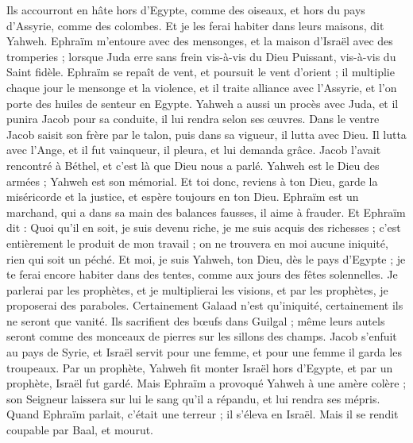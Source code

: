 \begin{multicols}{2}
Ils accourront en hâte hors d'Egypte, comme des oiseaux, et hors du pays d'Assyrie, comme des colombes. Et je les ferai habiter dans leurs maisons, dit Yahweh.
\VerseOne{}Ephraïm m'entoure avec des mensonges, et la maison d'Israël avec des tromperies ; lorsque Juda erre sans frein vis-à-vis du Dieu Puissant, vis-à-vis du Saint fidèle.
Ephraïm se repaît de vent, et poursuit le vent d'orient ; il multiplie chaque jour le mensonge et la violence, et il traite alliance avec l'Assyrie, et l'on porte des huiles de senteur en Egypte.
Yahweh a aussi un procès avec Juda, et il punira Jacob pour sa conduite, il lui rendra selon ses œuvres.
Dans le ventre Jacob saisit son frère par le talon, puis dans sa vigueur, il lutta avec Dieu.
Il lutta avec l'Ange, et il fut vainqueur, il pleura, et lui demanda grâce. Jacob l'avait rencontré à Béthel, et c'est là que Dieu nous a parlé.
Yahweh est le Dieu des armées ; Yahweh est son mémorial.
Et toi donc, reviens à ton Dieu, garde la miséricorde et la justice, et espère toujours en ton Dieu.
Ephraïm est un marchand, qui a dans sa main des balances fausses, il aime à frauder.
Et Ephraïm dit : Quoi qu'il en soit, je suis devenu riche, je me suis acquis des richesses ; c'est entièrement le produit de mon travail ; on ne trouvera en moi aucune iniquité, rien qui soit un péché.
Et moi, je suis Yahweh, ton Dieu, dès le pays d'Egypte ; je te ferai encore habiter dans des tentes, comme aux jours des fêtes solennelles.
Je parlerai par les prophètes, et je multiplierai les visions, et par les prophètes, je proposerai des paraboles.
Certainement Galaad n'est qu'iniquité, certainement ils ne seront que vanité. Ils sacrifient des bœufs dans Guilgal ; même leurs autels seront comme des monceaux de pierres sur les sillons des champs.
Jacob s'enfuit au pays de Syrie, et Israël servit pour une femme, et pour une femme il garda les troupeaux.
Par un prophète, Yahweh fit monter Israël hors d'Egypte, et par un prophète, Israël fut gardé.
Mais Ephraïm a provoqué Yahweh à une amère colère ; son Seigneur laissera sur lui le sang qu'il a répandu, et lui rendra ses mépris.
\VerseOne{}Quand Ephraïm parlait, c'était une terreur ; il s'éleva en Israël. Mais il se rendit coupable par Baal, et mourut.

\end{multicols}

